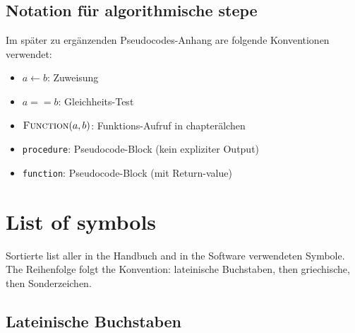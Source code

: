 \documentclass[11pt,a4paper,twoside]{article}
\theoremstyle{remark}
\begin{document}
\subsection{Notation f\"ur algorithmische stepe}

Im sp\"ater zu erg\"anzenden Pseudocodes-Anhang are folgende Konventionen
verwendet:

\begin{itemize}\setlength{\itemsep}{2pt}
  \item $a \gets b$: Zuweisung
  \item $a == b$: Gleichheits-Test
  \item $\textsc{Function}(a, b)$: Funktions-Aufruf in chapter\"alchen
  \item \texttt{procedure}: Pseudocode-Block (kein expliziter Output)
  \item \texttt{function}: Pseudocode-Block (mit Return-value)
\end{itemize}

\section{List of symbols}
\label{app:symbols}

Sortierte list aller in the Handbuch and in the Software verwendeten
Symbole. The Reihenfolge folgt the Konvention: lateinische
Buchstaben, then griechische, then Sonderzeichen.

\subsection{Lateinische Buchstaben}
\end{document}
